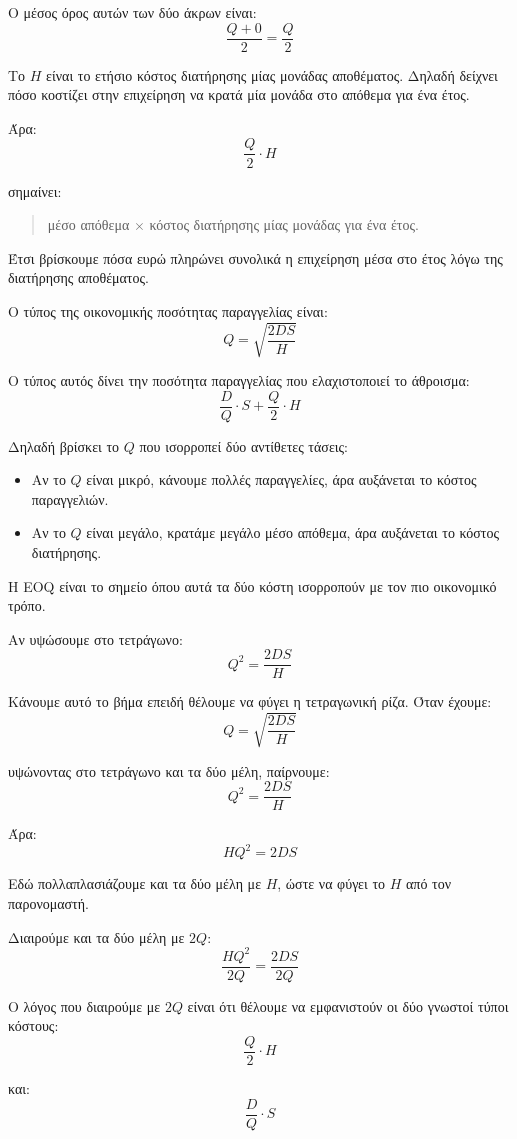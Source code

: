 \documentclass[12pt,a4paper]{article}
\begin{document}
Ο μέσος όρος αυτών των δύο άκρων είναι:
\[
\frac{Q+0}{2}=\frac{Q}{2}
\]

Το \(H\) είναι το ετήσιο κόστος διατήρησης μίας μονάδας αποθέματος. Δηλαδή δείχνει πόσο κοστίζει στην επιχείρηση να κρατά μία μονάδα στο απόθεμα για ένα έτος.

Άρα:
\[
\frac{Q}{2}\cdot H
\]

σημαίνει:

\begin{quote}
μέσο απόθεμα \(\times\) κόστος διατήρησης μίας μονάδας για ένα έτος.
\end{quote}

Έτσι βρίσκουμε πόσα ευρώ πληρώνει συνολικά η επιχείρηση μέσα στο έτος λόγω της διατήρησης αποθέματος.

Ο τύπος της οικονομικής ποσότητας παραγγελίας είναι:
\[
Q=\sqrt{\frac{2DS}{H}}
\]

Ο τύπος αυτός δίνει την ποσότητα παραγγελίας που ελαχιστοποιεί το άθροισμα:
\[
\frac{D}{Q}\cdot S+\frac{Q}{2}\cdot H
\]

Δηλαδή βρίσκει το \(Q\) που ισορροπεί δύο αντίθετες τάσεις:

\begin{itemize}
    \item Αν το \(Q\) είναι μικρό, κάνουμε πολλές παραγγελίες, άρα αυξάνεται το κόστος παραγγελιών.
    \item Αν το \(Q\) είναι μεγάλο, κρατάμε μεγάλο μέσο απόθεμα, άρα αυξάνεται το κόστος διατήρησης.
\end{itemize}

Η EOQ είναι το σημείο όπου αυτά τα δύο κόστη ισορροπούν με τον πιο οικονομικό τρόπο.

Αν υψώσουμε στο τετράγωνο:
\[
Q^2=\frac{2DS}{H}
\]

Κάνουμε αυτό το βήμα επειδή θέλουμε να φύγει η τετραγωνική ρίζα. Όταν έχουμε:
\[
Q=\sqrt{\frac{2DS}{H}}
\]

υψώνοντας στο τετράγωνο και τα δύο μέλη, παίρνουμε:
\[
Q^2=\frac{2DS}{H}
\]

Άρα:
\[
HQ^2=2DS
\]

Εδώ πολλαπλασιάζουμε και τα δύο μέλη με \(H\), ώστε να φύγει το \(H\) από τον παρονομαστή.

Διαιρούμε και τα δύο μέλη με \(2Q\):
\[
\frac{HQ^2}{2Q}=\frac{2DS}{2Q}
\]

Ο λόγος που διαιρούμε με \(2Q\) είναι ότι θέλουμε να εμφανιστούν οι δύο γνωστοί τύποι κόστους:
\[
\frac{Q}{2}\cdot H
\]

και:
\[
\frac{D}{Q}\cdot S
\]
\end{document}
